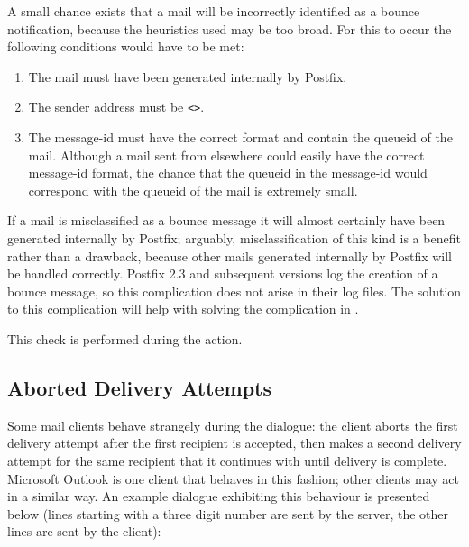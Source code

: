 A small chance exists that a mail will be incorrectly identified as a
bounce notification, because the heuristics used may be too broad.  For this to
occur the following conditions would have to be met:

\begin{enumerate}

    \squeezeitems{}

    \item The mail must have been generated internally by Postfix.

    \item The sender address must be \verb!<>!.\glsadd{<>}

    \item The message-id must have the correct format and contain the
        queueid of the mail.  Although a mail sent from elsewhere could
        easily have the correct message-id format, the chance that the
        queueid in the message-id would correspond with the queueid of the
        mail is extremely small.

\end{enumerate}

If a mail is misclassified as a bounce message it will almost certainly
have been generated internally by Postfix; arguably, misclassification of
this kind is a benefit rather than a drawback, because other mails
generated internally by Postfix will be handled correctly.  Postfix 2.3 and
subsequent versions log the creation of a bounce message, so this
complication does not arise in their log files.  The solution to this
complication will help with solving the complication in .

This check is performed during the  action.

\subsection{Aborted Delivery Attempts}

\label{aborted delivery attempts}

Some mail clients behave strangely during the  dialogue: the
client aborts the first delivery attempt after the first recipient is
accepted, then makes a second delivery attempt for the same recipient that
it continues with until delivery is complete.  Microsoft Outlook is one
client that behaves in this fashion; other clients may act in a similar
way.  An example dialogue exhibiting this behaviour is presented below
(lines starting with a three digit number are sent by the server, the other
lines are sent by the client):

